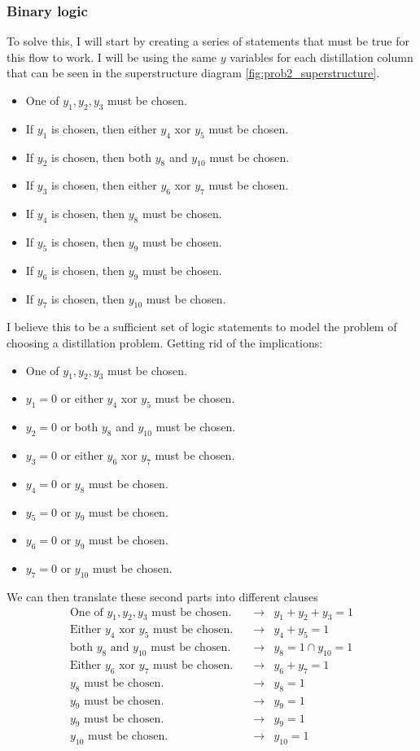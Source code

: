 \documentclass[11pt]{article}
\begin{document}
\subsubsection{Binary logic}
To solve this, I will start by creating a series of statements that must be true for this flow to work.
I will be using the same $y$ variables for each distillation column that can be seen in the superstructure diagram \ref{fig:prob2_superstructure}.
\begin{itemize}
  \item One of $y_1,y_2,y_3$ must be chosen.
  \item If $y_1$ is chosen, then either $y_4$ xor $y_5$ must be chosen.
  \item If $y_2$ is chosen, then both $y_8$ and $y_{10}$ must be chosen.
  \item If $y_3$ is chosen, then either $y_6$ xor $y_7$ must be chosen.
  \item If $y_4$ is chosen, then $y_8$ must be chosen.
  \item If $y_5$ is chosen, then $y_9$ must be chosen.
  \item If $y_6$ is chosen, then $y_9$ must be chosen.
  \item If $y_7$ is chosen, then $y_{10}$ must be chosen.
\end{itemize}
I believe this to be a sufficient set of logic statements to model the problem of choosing a distillation problem.
Getting rid of the implications:
\begin{itemize}
  \item One of $y_1,y_2,y_3$ must be chosen.
  \item $y_1=0$ or either $y_4$ xor $y_5$ must be chosen.
  \item $y_2=0$ or both $y_8$ and $y_{10}$ must be chosen.
  \item $y_3=0$ or either $y_6$ xor $y_7$ must be chosen.
  \item $y_4=0$ or $y_8$ must be chosen.
  \item $y_5=0$ or $y_9$ must be chosen.
  \item $y_6=0$ or $y_9$ must be chosen.
  \item $y_7=0$ or $y_{10}$ must be chosen.
\end{itemize}
We can then translate these second parts into different clauses
\begin{align*}
  \text{One of $y_1,y_2,y_3$ must be chosen.} & \quad \rightarrow & y_1 + y_2 + y_3 = 1 \\
  \text{Either $y_4$ xor $y_5$ must be chosen.} & \quad \rightarrow & y_4 + y_5 = 1 \\
  \text{both $y_8$ and $y_{10}$ must be chosen.} & \quad \rightarrow & y_8 =1 \cap y_{10} = 1  \\
  \text{Either $y_6$ xor $y_7$ must be chosen.} & \quad \rightarrow & y_6 + y_7 = 1 \\
  \text{$y_8$ must be chosen.} & \quad \rightarrow & y_8 = 1 \\
  \text{$y_9$ must be chosen.}& \quad \rightarrow & y_9 = 1 \\
  \text{$y_9$ must be chosen.} & \quad \rightarrow & y_9 = 1 \\
  \text{$y_{10}$ must be chosen.} & \quad \rightarrow & y_{10} =1
\end{align*}
\end{document}
